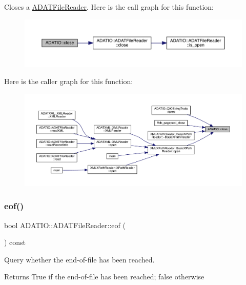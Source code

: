 Closes a \mbox{\hyperlink{classADATIO_1_1ADATFileReader}{A\+D\+A\+T\+File\+Reader}}. Here is the call graph for this function\+:
\nopagebreak
\begin{figure}[H]
\begin{center}
\leavevmode
\includegraphics[width=350pt]{db/de5/group__qio_gac32c771b58d87e4ef4af62a7ad2e5c0d_cgraph}
\end{center}
\end{figure}
Here is the caller graph for this function\+:
\nopagebreak
\begin{figure}[H]
\begin{center}
\leavevmode
\includegraphics[width=350pt]{db/de5/group__qio_gac32c771b58d87e4ef4af62a7ad2e5c0d_icgraph}
\end{center}
\end{figure}
\mbox{\label{group__qio_ga22337f3cfe1b2ecd1ead8d2755a1f9ca}} 
\subsubsection{\texorpdfstring{eof()}{eof()}}
{\footnotesize\ttfamily bool A\+D\+A\+T\+I\+O\+::\+A\+D\+A\+T\+File\+Reader\+::eof (\begin{DoxyParamCaption}{ }\end{DoxyParamCaption}) const}



Query whether the end-\/of-\/file has been reached. 

\begin{DoxyReturn}{Returns}
True if the end-\/of-\/file has been reached; false otherwise 
\end{DoxyReturn}
\mbox{\label{group__qio_ga40c1ee10fe351724bdfc91f4fd655328}} 
